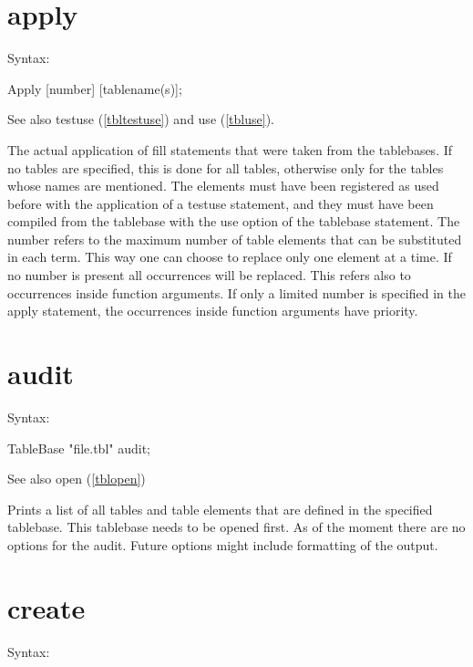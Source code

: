 
\section{apply}
\label{tblapply}

\noindent Syntax:

Apply [number] [tablename(s)];

\noindent See also testuse (\ref{tbltestuse}) and use (\ref{tbluse}).

\noindent The actual application of fill 
statements that were taken from the tablebases. If no tables are specified, 
this is done for all tables, otherwise only for the tables whose names are 
mentioned. The elements must have been registered as used before with the 
application of a testuse statement, and they must have been 
compiled from the tablebase with the use option of the tablebase 
statement. The number refers to the maximum number of table elements that 
can be substituted in each term. This way one can choose to replace only 
one element at a time. If no number is present all occurrences will be 
replaced. This refers also to occurrences inside function arguments. If only 
a limited number is specified in the apply statement, the occurrences 
inside function arguments have priority.


\section{audit}
\label{tblaudit}

\noindent Syntax:

TableBase "file.tbl" audit;

\noindent See also open (\ref{tblopen})

\noindent Prints a list of all tables and table elements that 
are defined in the specified tablebase. This tablebase needs to be opened 
first. As of the moment there are no options for the audit. Future options 
might include formatting of the output.


\section{create}
\label{tblcreate}

\noindent Syntax:

